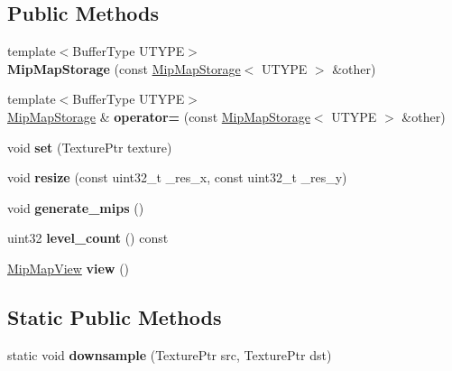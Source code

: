 \subsection*{Public Methods}
\begin{DoxyCompactItemize}
\item 
\mbox{\label{struct_mip_map_storage_a87ed3e97080201ec964ee9da89ecdaf9}} 
{\footnotesize template$<$Buffer\+Type U\+T\+Y\+PE$>$ }\\{\bfseries Mip\+Map\+Storage} (const \hyperlink{struct_mip_map_storage}{Mip\+Map\+Storage}$<$ U\+T\+Y\+PE $>$ \&other)
\item 
\mbox{\label{struct_mip_map_storage_a2690a2d16f541a988301377635e6a056}} 
{\footnotesize template$<$Buffer\+Type U\+T\+Y\+PE$>$ }\\\hyperlink{struct_mip_map_storage}{Mip\+Map\+Storage} \& {\bfseries operator=} (const \hyperlink{struct_mip_map_storage}{Mip\+Map\+Storage}$<$ U\+T\+Y\+PE $>$ \&other)
\item 
\mbox{\label{struct_mip_map_storage_a850b9177f676cf28ff867534a355e4ba}} 
void {\bfseries set} (Texture\+Ptr texture)
\item 
\mbox{\label{struct_mip_map_storage_a1068590c92bd2eb253c204d70d275f63}} 
void {\bfseries resize} (const uint32\+\_\+t \+\_\+res\+\_\+x, const uint32\+\_\+t \+\_\+res\+\_\+y)
\item 
\mbox{\label{struct_mip_map_storage_a3afa10e31ddd056d79749cd1c96b32a2}} 
void {\bfseries generate\+\_\+mips} ()
\item 
\mbox{\label{struct_mip_map_storage_afa581eb81c37598c6d8624f8ca67a52e}} 
uint32 {\bfseries level\+\_\+count} () const
\item 
\mbox{\label{struct_mip_map_storage_ae7c42dd84ef516fa1583ed87b5c88237}} 
\hyperlink{struct_mip_map_view}{Mip\+Map\+View} {\bfseries view} ()
\end{DoxyCompactItemize}
\subsection*{Static Public Methods}
\begin{DoxyCompactItemize}
\item 
\mbox{\label{struct_mip_map_storage_ad84067580f5608dae7e36467c8144e19}} 
static void {\bfseries downsample} (Texture\+Ptr src, Texture\+Ptr dst)
\end{DoxyCompactItemize}
